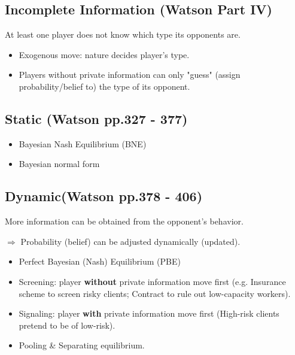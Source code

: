 \documentclass{article}
\begin{document}
\begin{mdframed}[backgroundcolor=blue!20,linecolor=white]
\section*{Incomplete Information (Watson Part IV)}
At least one player does not know which type its opponents are.

\begin{itemize}
\item Exogenous move: nature decides player's type.
\item Players without private information can only "guess" (assign probability/belief to) the type of its opponent.
\end{itemize}
\subsection*{\hspace{4mm} Static (Watson pp.327 - 377)}
\begin{itemize}
\item Bayesian Nash Equilibrium (BNE)
\item Bayesian normal form

\end{itemize}

\subsection*{\hspace{4mm} Dynamic(Watson pp.378 - 406)}
\hspace{4mm} More information can be obtained from the opponent's behavior.

\hspace{4mm}  $\Rightarrow$ Probability (belief) can be adjusted dynamically (updated).
\begin{itemize}
\item Perfect Bayesian (Nash) Equilibrium (PBE)
\item Screening: player \textbf{without} private information move first (e.g. Insurance scheme to screen risky clients; Contract to rule out low-capacity workers).
\item Signaling: player \textbf{with} private information move first (High-risk clients pretend to be of low-risk).
\item Pooling \& Separating equilibrium.
\end{itemize}

\end{mdframed}
\end{document}
